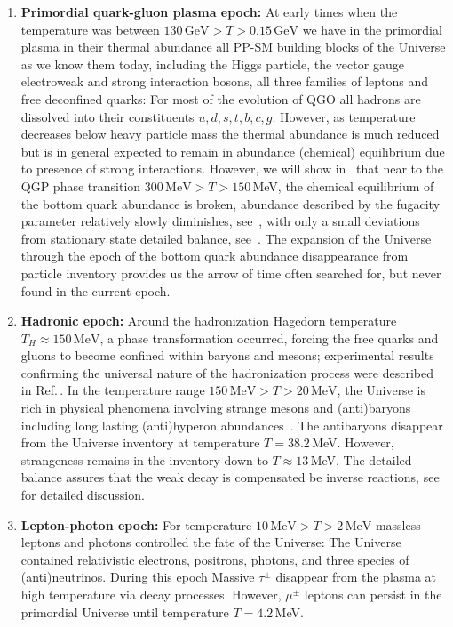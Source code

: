 \begin{enumerate}
\item \textbf{Primordial quark-gluon plasma epoch:} 
At early times when the temperature was between $130\,\mathrm{GeV}>T>0.15\,\mathrm{GeV}$ we have in the primordial plasma in their thermal abundance all PP-SM building blocks of the Universe as we know them today, including the Higgs particle, the vector gauge electroweak and strong interaction bosons, all three families of leptons and free deconfined quarks: For most of the evolution of QGO all hadrons are dissolved into their constituents $u,d,s,t,b,c,g$. However, as temperature decreases below heavy particle mass the thermal abundance is much reduced but is in general expected to remain in abundance (chemical) equilibrium due to presence of strong interactions. However, we will show in~ that near to the QGP phase transition $300\, \mathrm{MeV}>T>150$\,MeV, the chemical equilibrium of the bottom quark abundance is broken, abundance described by the fugacity parameter relatively slowly diminishes, see~, with only a small deviations from stationary state detailed balance, see~. The expansion of the Universe through the epoch of the bottom quark abundance disappearance from particle inventory provides us the arrow of time often searched for, but never found in the current epoch.
%
\item \textbf{Hadronic epoch:} Around the hadronization Hagedorn temperature $T_H\approx 150\,\mathrm{MeV}$, a phase transformation occurred, forcing the free quarks and gluons to become confined within baryons and mesons; experimental results confirming the universal nature of the hadronization process were described in Ref.\,\cite{Letessier:2005qe}. In the temperature range $ 150\,\mathrm{MeV}>T>20\,\mathrm{MeV}$, the Universe is rich in physical phenomena involving strange mesons and (anti)baryons including long lasting (anti)hyperon abundances~\cite{Fromerth:2012fe,Yang:2021bko}. The antibaryons disappear from the Universe inventory at temperature $T=38.2$\,MeV. However, strangeness remains in the inventory down to $T\approx13$\,MeV. The detailed balance assures that the weak decay is compensated be inverse reactions, see  for detailed discussion.
%
\item \textbf{Lepton-photon epoch:} For temperature $10\,\mathrm{MeV}>T>2\,\mathrm{MeV}$ massless leptons and photons controlled the fate of the Universe: The Universe contained relativistic electrons, positrons, photons, and three species of (anti)neutrinos. During this epoch Massive $\tau^\pm$ disappear from the plasma at high temperature via decay processes. However, $\mu^\pm$ leptons can persist in the primordial Universe until temperature $T=4.2$\,MeV.


\end{enumerate}
